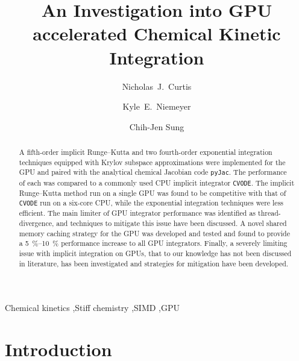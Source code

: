 \documentclass[preprint]{elsarticle}
\begin{document}
\begin{frontmatter}

\title{An Investigation into GPU accelerated Chemical Kinetic Integration}

\author[uconn]{Nicholas~J.\ Curtis}
\author[osu]{Kyle~E.\ Niemeyer}
\author[uconn]{Chih-Jen Sung}

\address[uconn]{Department of Mechanical Engineering\\
  University of Connecticut, Storrs, CT, 06269, USA}
\address[osu]{School of Mechanical, Industrial, and Manufacturing Engineering\\
  Oregon State University, Corvallis, OR 97331, USA}
  

\begin{abstract}
A fifth-order implicit Runge--Kutta and two fourth-order exponential integration techniques equipped with Krylov subspace approximations were implemented for the GPU and paired with the analytical chemical Jacobian code \texttt{pyJac}.
The performance of each was compared to a commonly used CPU implicit integrator \texttt{CVODE}.
The implicit Runge--Kutta method run on a single GPU was found to be competitive with that of \texttt{CVODE} run on a six-core CPU, while the exponential integration techniques were less efficient.
The main limiter of GPU integrator performance was identified as thread-divergence, and techniques to mitigate this issue have been discussed.
A novel shared memory caching strategy for the GPU was developed and tested and found to provide a \SIrange{5}{10}{\percent} performance increase to all GPU integrators.
Finally, a severely limiting issue with implicit integration on GPUs, that to our knowledge has not been discussed in literature, has been investigated and strategies for mitigation have been developed.
\end{abstract}

\begin{keyword}
 Chemical kinetics \sep Stiff chemistry \sep SIMD \sep GPU
\end{keyword}

\end{frontmatter}
\pagebreak

\section{Introduction}
\label{sec:Intro}
\end{document}
